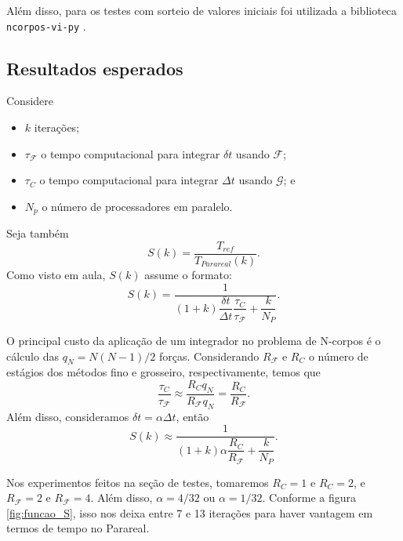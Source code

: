 Além disso, para os testes com sorteio de valores iniciais foi utilizada a biblioteca \texttt{ncorpos-vi-py} \cite{ncorpos_vi_py}.

\subsection{Resultados esperados}

Considere
\begin{itemize}
    \item  $k$ iterações;
    \item $\tau_{\mathcal F}$ o tempo computacional para integrar $\delta t$ usando $\mathcal F$;
    \item $\tau_C$ o tempo computacional para integrar $\Delta t$ usando $\mathcal G$; e
    \item $N_p$ o número de processadores em paralelo.
\end{itemize}
Seja também
\begin{equation}\label{eq:parareal_edo_estimativa_ganho}
    S(k) = \dfrac{T_{ref}}{T_{Parareal}(k)}.
\end{equation}
Como visto em aula, $S(k)$ assume o formato:
\begin{equation}
    S(k) = \dfrac{1}{(1+k) \dfrac{\delta t}{\Delta t} \dfrac{\tau_C}{\tau_{\mathcal F}} + \dfrac{k}{N_P}}.
\end{equation}

O principal custo da aplicação de um integrador no problema de N-corpos é o cálculo das $q_N = N(N-1)/2$ forças. Considerando $R_{\mathcal F}$ e $R_C$ o número de estágios dos métodos fino e grosseiro, respectivamente, temos que
\begin{equation}
\dfrac{\tau_C}{\tau_{\mathcal F}} \approx \dfrac{R_C q_N}{R_{\mathcal F} q_N} = \dfrac{R_C}{R_{\mathcal F}}.
\end{equation}
Além disso, consideramos $\delta t = \alpha \Delta t$, então
\begin{equation}
    S(k) \approx \dfrac{1}{(1 + k) \alpha \dfrac{R_C}{R_{\mathcal F}} + \dfrac{k}{N_P}}.
\end{equation}

Nos experimentos feitos na seção de testes, tomaremos $R_C=1$ e $R_C=2$, e $R_{\mathcal F}=2$ e $R_{\mathcal F}=4$. Além disso, $\alpha=4/32$ ou $\alpha=1/32$. Conforme a figura \ref{fig:funcao_S}, isso nos deixa entre 7 e 13 iterações para haver vantagem em termos de tempo no Parareal.

